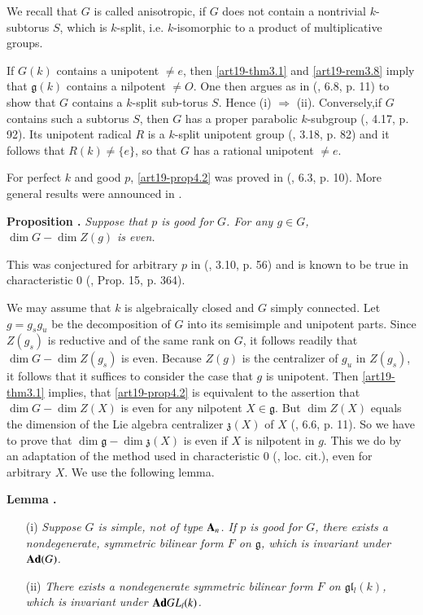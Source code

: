 We recall that $G$ is called anisotropic, if $G$ does not contain a nontrivial $k$-subtorus $S$, which is $k$-split, i.e. $k$-isomorphic to a product of multiplicative groups.

If $G(k)$ contains a unipotent $\neq e$, then \ref{art19-thm3.1} and \ref{art19-rem3.8} imply that $\mathfrak{g}(k)$ contains a nilpotent $\neq O$. One then argues as in (\cite{art19-key10}, 6.8, p. 11) to show that $G$ contains a $k$-split sub-torus $S$. Hence (i) $\Rightarrow$ (ii). Conversely,\pageoriginale if $G$ contains such a subtorus $S$, then $G$ has a proper parabolic $k$-subgroup (\cite{art19-key3}, 4.17, p. 92). Its unipotent radical $R$ is a $k$-split unipotent group (\cite{art19-key3}, 3.18, p. 82) and it follows that $R(k)\neq \{e\}$, so that $G$ has a rational unipotent $\neq e$.

For perfect $k$ and good $p$, \ref{art19-prop4.2} was proved in (\cite{art19-key10}, 6.3, p. 10). More general results were announced in \cite{art19-key17}.

\medskip
\noindent
{\bf Proposition .\label{art19-prop4.3}}
{\em Suppose that $p$ is good for $G$. For any $g\in G$, $\dim G-\dim Z(g)$ is even.}
\smallskip

This was conjectured for arbitrary $p$ in (\cite{art19-key15}, 3.10, p. 56) and is known to be true in characteristic 0 (\cite{art19-key9}, Prop. 15, p. 364).

We may assume that $k$ is algebraically closed and $G$ simply connected. Let $g=g_{s}g_{u}$ be the decomposition of $G$ into its semisimple and unipotent parts. Since $Z(g_{s})$ is reductive and of the same rank on $G$, it follows readily that $\dim G-\dim Z(g_{s})$ is even. Because $Z(g)$ is the centralizer of $g_{u}$ in $Z(g_{s})$, it follows that it suffices to consider the case that $g$ is unipotent. Then \ref{art19-thm3.1} implies, that \ref{art19-prop4.2} is equivalent to the assertion that $\dim G-\dim Z(X)$ is even for any nilpotent $X\in \mathfrak{g}$. But $\dim Z(X)$ equals the dimension of the Lie algebra centralizer $\mathfrak{z}(X)$ of $X$ (\cite{art19-key10}, 6.6, p. 11). So we have to prove that $\dim \mathfrak{g}-\dim \mathfrak{z}(X)$ is even if $X$ is nilpotent in $g$. This we do by an adaptation of the method used in characteristic 0 (\cite{art19-key9}, loc. cit.), even for arbitrary $X$. We use the following lemma.

\medskip
\noindent
{\bf Lemma .\label{art19-lem4.4}}
\begin{itemize}
\item[\rm(i)] {\em Suppose $G$ is simple, not of type $\mathbf{A}_{n}$. If $p$ is good for $G$, there exists a nondegenerate, symmetric bilinear form $F$ on $\mathfrak{g}$, which is invariant under $\mathbf{Ad}(G)$.}

\item[\rm(ii)] {\em There exists a nondegenerate symmetric bilinear form $F$ on $\mathfrak{g}\mathfrak{l}_{l}(k)$, which is invariant under $\mathbf{Ad} GL_{l}(k)$.}
\end{itemize}

